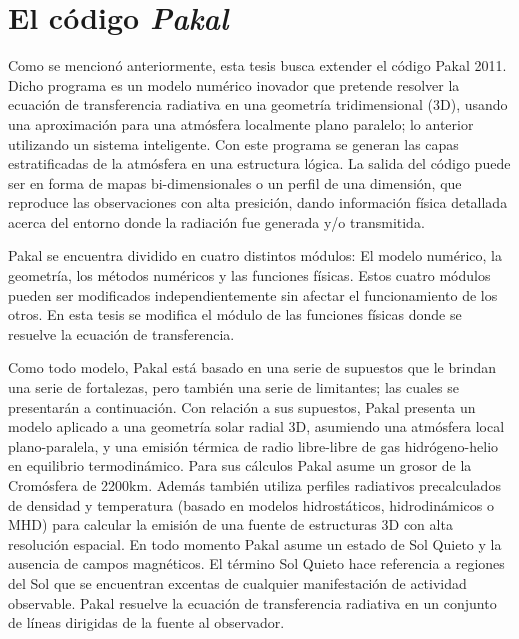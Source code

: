 \section{El c\'odigo \emph{Pakal}}
Como se mencion\'o anteriormente, esta tesis busca extender el c\'odigo Pakal 2011\citep{Pakal}. Dicho programa es un modelo num\'erico inovador que pretende resolver la ecuaci\'on de transferencia radiativa en una geometr\'ia tridimensional (3D), usando una aproximaci\'on para una atm\'osfera localmente plano paralelo; lo anterior utilizando un sistema inteligente. Con este programa se generan las capas estratificadas de la atm\'osfera en una estructura l\'ogica. La salida del c\'odigo puede ser en forma de mapas bi-dimensionales o un perfil de una dimensi\'on, que reproduce las observaciones con alta presici\'on, dando informaci\'on f\'isica detallada acerca del entorno donde la radiaci\'on fue generada y/o transmitida.

Pakal se encuentra dividido en cuatro distintos m\'odulos: El modelo num\'erico, la geometr\'ia, los m\'etodos num\'ericos y las funciones f\'isicas. Estos cuatro m\'odulos pueden ser modificados independientemente sin afectar el funcionamiento de los otros. En esta tesis se modifica el m\'odulo de las funciones f\'isicas donde se resuelve la ecuaci\'on de transferencia.

Como todo modelo, Pakal est\'a basado en una serie de supuestos que le brindan una serie de fortalezas, pero tambi\'en una serie de limitantes; las cuales se presentar\'an a continuaci\'on. Con relaci\'on a sus supuestos, Pakal presenta un modelo aplicado a una geometr\'ia solar radial 3D, asumiendo una atm\'osfera local plano-paralela, y una emisi\'on t\'ermica de radio libre-libre de gas hidr\'ogeno-helio en equilibrio termodin\'amico. Para sus c\'alculos Pakal asume un grosor de la Crom\'osfera de 2200km. Adem\'as tambi\'en utiliza perfiles radiativos precalculados de densidad y temperatura (basado en modelos hidrost\'aticos, hidrodin\'amicos o MHD) para calcular la emisi\'on de una fuente de estructuras 3D con alta resoluci\'on espacial. En todo momento Pakal asume un estado de Sol Quieto y la ausencia de campos magn\'eticos. El t\'ermino Sol Quieto hace referencia a regiones del Sol que se encuentran excentas de cualquier manifestaci\'on de actividad observable. Pakal resuelve la ecuaci\'on de transferencia radiativa en un conjunto de l\'ineas dirigidas de la fuente al observador.

